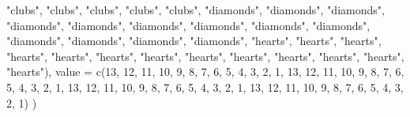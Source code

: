 \documentclass[
  11pt,
]{krantz}
\makeatletter
\newenvironment{Shaded}{\begin{snugshade}}{\end{snugshade}}
\newcommand{\AttributeTok}[1]{\textcolor[rgb]{0.61,0.61,0.61}{#1}}
\newcommand{\DecValTok}[1]{\textcolor[rgb]{0.06,0.06,0.06}{#1}}
\newcommand{\FunctionTok}[1]{\textcolor[rgb]{0,0,0}{#1}}
\newcommand{\NormalTok}[1]{#1}
\newcommand{\StringTok}[1]{\textcolor[rgb]{0.5,0.5,0.5}{#1}}
\newenvironment{kframe}{%
\medskip{}
\setlength{\fboxsep}{.8em}
 \def\at@end@of@kframe{}%
 \ifinner\ifhmode%
  \def\at@end@of@kframe{\end{minipage}}%
  \begin{minipage}{\columnwidth}%
 \fi\fi%
 \def\FrameCommand##1{\hskip\@totalleftmargin \hskip-\fboxsep
 \colorbox{shadecolor}{##1}\hskip-\fboxsep
     \hskip-\linewidth \hskip-\@totalleftmargin \hskip\columnwidth}%
 \MakeFramed {\advance\hsize-\width
   \@totalleftmargin\z@ \linewidth\hsize
   \@setminipage}}%
 {\par\unskip\endMakeFramed%
 \at@end@of@kframe}
\renewenvironment{Shaded}{\begin{kframe}}{\end{kframe}}
\theoremstyle{definition}
\theoremstyle{definition}
\theoremstyle{definition}
\theoremstyle{definition}
\theoremstyle{remark}
\makeatother
\begin{document}
\begin{Shaded}
\begin{Highlighting}[]
  \StringTok{"clubs"}\NormalTok{, }\StringTok{"clubs"}\NormalTok{, }\StringTok{"clubs"}\NormalTok{, }\StringTok{"clubs"}\NormalTok{, }\StringTok{"clubs"}\NormalTok{, }\StringTok{"diamonds"}\NormalTok{, }
  \StringTok{"diamonds"}\NormalTok{, }\StringTok{"diamonds"}\NormalTok{, }\StringTok{"diamonds"}\NormalTok{, }\StringTok{"diamonds"}\NormalTok{, }
  \StringTok{"diamonds"}\NormalTok{, }\StringTok{"diamonds"}\NormalTok{, }\StringTok{"diamonds"}\NormalTok{, }\StringTok{"diamonds"}\NormalTok{, }
  \StringTok{"diamonds"}\NormalTok{, }\StringTok{"diamonds"}\NormalTok{, }\StringTok{"diamonds"}\NormalTok{, }\StringTok{"diamonds"}\NormalTok{, }\StringTok{"hearts"}\NormalTok{, }
  \StringTok{"hearts"}\NormalTok{, }\StringTok{"hearts"}\NormalTok{, }\StringTok{"hearts"}\NormalTok{, }\StringTok{"hearts"}\NormalTok{, }\StringTok{"hearts"}\NormalTok{, }
  \StringTok{"hearts"}\NormalTok{, }\StringTok{"hearts"}\NormalTok{, }\StringTok{"hearts"}\NormalTok{, }\StringTok{"hearts"}\NormalTok{, }\StringTok{"hearts"}\NormalTok{, }
  \StringTok{"hearts"}\NormalTok{, }\StringTok{"hearts"}\NormalTok{), }
  \AttributeTok{value =} \FunctionTok{c}\NormalTok{(}\DecValTok{13}\NormalTok{, }\DecValTok{12}\NormalTok{, }\DecValTok{11}\NormalTok{, }\DecValTok{10}\NormalTok{, }\DecValTok{9}\NormalTok{, }\DecValTok{8}\NormalTok{, }\DecValTok{7}\NormalTok{, }\DecValTok{6}\NormalTok{, }\DecValTok{5}\NormalTok{, }\DecValTok{4}\NormalTok{, }\DecValTok{3}\NormalTok{, }\DecValTok{2}\NormalTok{, }\DecValTok{1}\NormalTok{, }\DecValTok{13}\NormalTok{, }\DecValTok{12}\NormalTok{, }\DecValTok{11}\NormalTok{, }\DecValTok{10}\NormalTok{, }\DecValTok{9}\NormalTok{, }\DecValTok{8}\NormalTok{, }\DecValTok{7}\NormalTok{, }\DecValTok{6}\NormalTok{, }\DecValTok{5}\NormalTok{, }\DecValTok{4}\NormalTok{, }\DecValTok{3}\NormalTok{, }\DecValTok{2}\NormalTok{, }\DecValTok{1}\NormalTok{, }\DecValTok{13}\NormalTok{, }\DecValTok{12}\NormalTok{, }\DecValTok{11}\NormalTok{, }\DecValTok{10}\NormalTok{, }\DecValTok{9}\NormalTok{, }\DecValTok{8}\NormalTok{, }\DecValTok{7}\NormalTok{, }\DecValTok{6}\NormalTok{, }\DecValTok{5}\NormalTok{, }\DecValTok{4}\NormalTok{, }\DecValTok{3}\NormalTok{, }\DecValTok{2}\NormalTok{, }\DecValTok{1}\NormalTok{, }\DecValTok{13}\NormalTok{, }\DecValTok{12}\NormalTok{, }\DecValTok{11}\NormalTok{, }\DecValTok{10}\NormalTok{, }\DecValTok{9}\NormalTok{, }\DecValTok{8}\NormalTok{, }\DecValTok{7}\NormalTok{, }\DecValTok{6}\NormalTok{, }\DecValTok{5}\NormalTok{, }\DecValTok{4}\NormalTok{, }\DecValTok{3}\NormalTok{, }\DecValTok{2}\NormalTok{, }\DecValTok{1}\NormalTok{)}
\NormalTok{)}
\end{Highlighting}
\end{Shaded}
\end{document}
